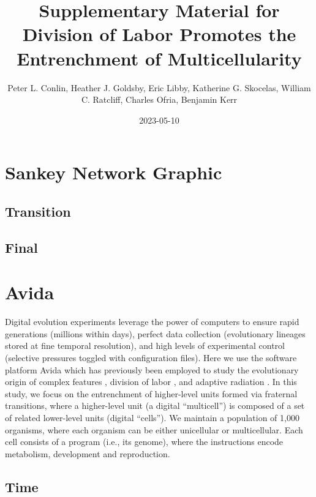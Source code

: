 \documentclass[
]{book}
\title{Supplementary Material for Division of Labor Promotes the Entrenchment of Multicellularity}
\author{Peter L. Conlin, Heather J. Goldsby, Eric Libby, Katherine G. Skocelas, William C. Ratcliff, Charles Ofria, Benjamin Kerr}
\date{2023-05-10}
\begin{document}
\maketitle

{
\setcounter{tocdepth}{1}
\tableofcontents
}
\hypertarget{sankey-network-graphic}{%
\chapter{Sankey Network Graphic}\label{sankey-network-graphic}}

\hypertarget{transition}{%
\section{Transition}\label{transition}}

\hypertarget{final}{%
\section{Final}\label{final}}

\hypertarget{avida}{%
\chapter{Avida}\label{avida}}

Digital evolution experiments leverage the power of computers to ensure rapid generations (millions within days), perfect data collection (evolutionary lineages stored at fine temporal resolution), and high levels of experimental control (selective pressures toggled with configuration files). Here we use the software platform Avida \citep{ofria2004avida} which has previously been employed to study the evolutionary origin of complex features \citep{Lenski2003}, division of labor \citep{goldsby2012task, goldsby2014evolutionary}, and adaptive radiation \citep{Chow2004}. In this study, we focus on the entrenchment of higher-level units formed via fraternal transitions, where a higher-level unit (a digital ``multicell'') is composed of a set of related lower-level units (digital ``cells''). We maintain a population of 1,000 organisms, where each organism can be either unicellular or multicellular. Each cell consists of a program (i.e., its genome), where the instructions encode metabolism, development and reproduction.

\hypertarget{time}{%
\section{Time}\label{time}}
\end{document}
